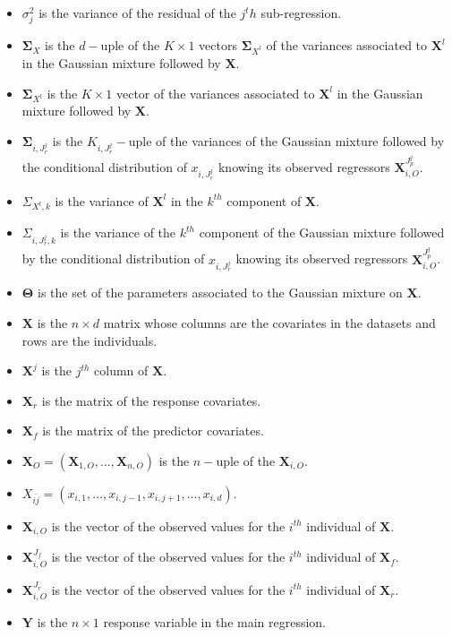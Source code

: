 \documentclass[12pt,a4paper]{report}
\begin{document}
\begin{itemize}
	\item $\sigma_j^2$ is the variance of the residual of the $j^th$ sub-regression.	
	\item $\boldsymbol{\Sigma}_X$ is the $d-$uple of the $K \times 1 $ vectors $\boldsymbol{\Sigma}_{X^l}$ of the variances associated to $\boldsymbol{X}^l$ in the Gaussian mixture followed by $\boldsymbol{X}$.
	\item $\boldsymbol{\Sigma}_{X^l}$ is the $K \times 1 $ vector of the variances associated to $\boldsymbol{X}^l$ in the Gaussian mixture followed by $\boldsymbol{X}$.
	\item $\boldsymbol{\Sigma}_{i,J_r^j}$ is the $K_{i,J_r^j}-$uple of the variances of the Gaussian mixture followed by the conditional distribution of $x_{i,J_r^j}$ knowing its observed regressors $\boldsymbol{X}_{i,O}^{J_p^j}$.	
	\item $\Sigma_{X^l,k}$ is the variance of $\boldsymbol{X}^l$ in the $k^{th}$ component of $\boldsymbol{X}$.
	\item $\Sigma_{i,J_r^j,k}$ is the variance of the $k^{th}$ component of the Gaussian mixture followed by the conditional distribution of $x_{i,J_r^j}$ knowing its observed regressors $\boldsymbol{X}_{i,O}^{J_p^j}$.
	\item $\boldsymbol{\Theta}$ is the set of the parameters associated to the Gaussian mixture on $\boldsymbol{X}$.	
	\item $\boldsymbol{X}$ is the $n\times d$ matrix whose columns are the covariates in the datasets and rows are the individuals.
	\item $\boldsymbol{X}^j$ is the $j^{th}$ column of $\boldsymbol{X}$.
	\item $\boldsymbol{X}_r$ is the matrix of the response covariates.
	\item $\boldsymbol{X}_f$ is the matrix of the predictor covariates.
	\item $\boldsymbol{X}_O=(\boldsymbol{X}_{1,O},\dots,\boldsymbol{X}_{n,O})$ is the $n-$uple of the $\boldsymbol{X}_{i,O}$.
	\item $X_{\bar{ij}}=(x_{i,1},\dots, x_{i,j-1},x_{i,j+1},\dots, x_{i,d})$.
	\item $\boldsymbol{X}_{i,O}$ is the vector of the observed values for the  $i^{th}$ individual of $\boldsymbol{X}$.
	\item $\boldsymbol{X}_{i,O}^{J_f}$ is the vector of the observed values for the  $i^{th}$ individual of $\boldsymbol{X}_f$.
	\item $\boldsymbol{X}_{i,O}^{J_r}$ is the vector of the observed values for the  $i^{th}$ individual of $\boldsymbol{X}_r$.
	\item $\boldsymbol{Y}$ is the $n\times 1$ response variable in the main regression.
\end{itemize}
		  
\end{document}

